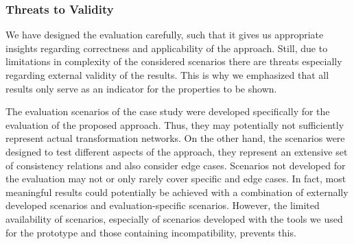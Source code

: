 

\subsubsection{Threats to Validity}

We have designed the evaluation carefully, such that it gives us appropriate insights regarding correctness and applicability of the approach.
Still, due to limitations in complexity of the considered scenarios there are threats especially regarding external validity of the results.
This is why we emphasized that all results only serve as an indicator for the properties to be shown.

The evaluation scenarios of the case study were developed specifically for the evaluation of the proposed approach.
Thus, they may potentially not sufficiently represent actual transformation networks.
On the other hand, the scenarios were designed to test different aspects of the approach, they represent an extensive set of consistency relations and also consider edge cases.
Scenarios not developed for the evaluation may not or only rarely cover specific and edge cases.
In fact, most meaningful results could potentially be achieved with a combination of externally developed scenarios and evaluation-specific scenarios.
However, the limited availability of scenarios, especially of scenarios developed with the tools we used for the prototype and those containing incompatibility, prevents this.

